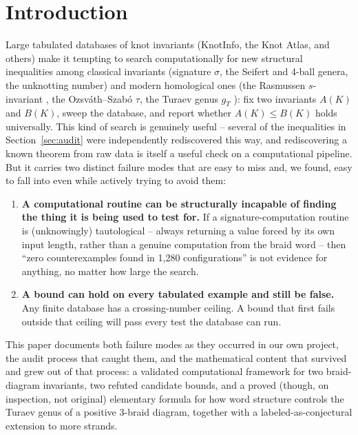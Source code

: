 \documentclass[11pt]{article}
\theoremstyle{definition}
\begin{document}
\section{Introduction}
\label{sec:intro}

Large tabulated databases of knot invariants (KnotInfo, the Knot Atlas, and others) make it tempting to search computationally for new structural inequalities among classical invariants (signature $\sigma$, the Seifert and 4-ball genera, the unknotting number) and modern homological ones (the Rasmussen $s$-invariant \cite{rasmussen2010}, the Ozsv\'ath--Szab\'o $\tau$, the Turaev genus $g_T$ \cite{turaev1987}): fix two invariants $A(K)$ and $B(K)$, sweep the database, and report whether $A(K) \leq B(K)$ holds universally. This kind of search is genuinely useful -- several of the inequalities in Section~\ref{sec:audit} were independently rediscovered this way, and rediscovering a known theorem from raw data is itself a useful check on a computational pipeline. But it carries two distinct failure modes that are easy to miss and, we found, easy to fall into even while actively trying to avoid them:

\begin{enumerate}
\item \textbf{A computational routine can be structurally incapable of finding the thing it is being used to test for.} If a signature-computation routine is (unknowingly) tautological -- always returning a value forced by its own input length, rather than a genuine computation from the braid word -- then ``zero counterexamples found in 1{,}280 configurations'' is not evidence for anything, no matter how large the search.
\item \textbf{A bound can hold on every tabulated example and still be false.} Any finite database has a crossing-number ceiling. A bound that first fails outside that ceiling will pass every test the database can run.
\end{enumerate}

This paper documents both failure modes as they occurred in our own project, the audit process that caught them, and the mathematical content that survived and grew out of that process: a validated computational framework for two braid-diagram invariants, two refuted candidate bounds, and a proved (though, on inspection, not original) elementary formula for how word structure controls the Turaev genus of a positive 3-braid diagram, together with a labeled-as-conjectural extension to more strands.
\end{document}
